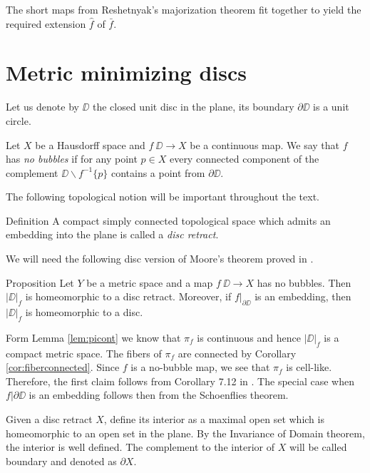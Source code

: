 \documentclass{article}
\begin{document}
The short maps from Reshetnyak's majorization theorem fit together to yield the required extension $\hat f$ of $\bar f$.
\qeds







\section{Metric minimizing discs}



Let us denote by $\DD$ the closed unit disc in the plane,
its boundary $\partial \DD$ is a unit circle.

Let $X$ be a Hausdorff space and
$f\:\DD\to X$ be a continuous map.
We say that $f$ has \emph{no bubbles}\label{page:no-bubble}
if for any point $p\in X$ every connected component of the complement $\DD\backslash f^{-1}\{p\}$ contains a point from $\partial \DD$.

The following topological notion will be important throughout the text.

\begin{thm}{Definition}
A compact simply connected topological space which admits an embedding into the plane is 
called a \emph{disc retract}. 
\end{thm}




We will need the following disc version of Moore's theorem \cite{moore} proved in \cite{LW3}.

\begin{thm}{Proposition}\label{prop:disc-moore}
Let $Y$ be a metric space and a map
$f\:\DD\to X$ has no bubbles.
Then $|\DD|_f$ is homeomorphic to a disc retract. Moreover, if $f|_{\partial\DD}$ is 
an embedding, then $|\DD|_f$ is homeomorphic to a disc.
\end{thm}


Form Lemma \ref{lem:picont} we know that $\pi_f$ is continuous and hence $|\DD|_f$
is a compact metric space. 
The fibers of $\pi_f$ are connected by Corollary \ref{cor:fiberconnected}.
Since $f$ is a no-bubble map, we see that $\pi_f$ is cell-like. 
Therefore, the first claim follows from 
Corollary 7.12 in \cite{LW3}.
The special case when $f|{\partial\DD}$ is an embedding follows then from the Schoenflies theorem.
\qeds

Given a disc retract $X$,
define its interior as a maximal open set which is homeomorphic to an open set in the plane.
By the Invariance of Domain theorem, the interior is well defined.
The complement to the interior of $X$ will be called boundary and denoted as $\partial X$.
\end{document}
